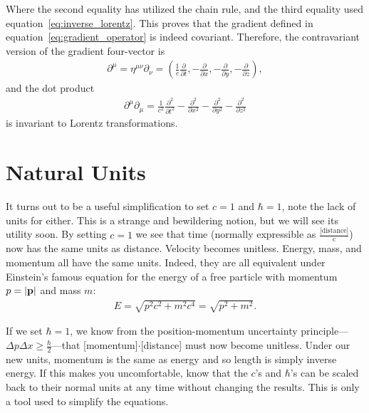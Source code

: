 \documentclass[titlepage,letterpaper,onecolumn,11pt,final]{report}
\numberwithin{equation}{section}
\numberwithin{figure}{section}
\begin{document}
%
Where the second equality has utilized the chain rule, and the third equality used equation~\ref{eq:inverse_lorentz}. This proves that the gradient defined in equation~\ref{eq:gradient_operator} is indeed covariant. Therefore, the contravariant version of the gradient four-vector is
\begin{gather}
	\label{eq:contravariant_gradient}
	\partial^{\mu} =  \eta^{\mu \nu} \partial_{\nu} = \left( \frac{1}{c} \frac{\partial}{\partial t}, -\frac{\partial}{\partial x}, -\frac{\partial}{\partial y}, -\frac{\partial}{\partial z} \right),
\end{gather}
%
and the dot product
\begin{gather}
	\label{eq:covariant_gradient}
	\partial^{\mu} \partial_{\mu} =  \frac{1}{c^{2}} \frac{\partial^{2}}{\partial t^{2}} -\frac{\partial^{2}}{\partial x^{2}} -\frac{\partial^{2}}{\partial y^{2}} -\frac{\partial^{2}}{\partial z^{2}}
\end{gather}
%
is invariant to Lorentz transformations.

\section{Natural Units}

It turns out to be a useful simplification to set $c = 1$ and $\hbar = 1$, note the lack of units for either. This is a strange and bewildering notion, but we will see its utility soon. By setting $c = 1$ we see that time (normally expressible as $\frac{\text{[distance]}}{\text{c}}$) now has the same units as distance. Velocity becomes unitless. Energy, mass, and momentum all have the same units. Indeed, they are all equivalent under Einstein's famous equation for the energy of a free particle with momentum $p = \left| \bf{p} \right|$ and mass $m$:
\begin{gather}
	\label{eq:Energy_mass_equivalence}
	E = \sqrt{p^{2} c^{2} + m^{2} c^{4}} = \sqrt{p^{2} + m^{2}} .
\end{gather}

If we set $\hbar = 1$, we know from the position-momentum uncertainty principle---$\Delta p \Delta x \geq \frac{\hbar}{2}$---that [momentum]$\cdot$[distance] must now become unitless. Under our new units, momentum is the same as energy and so length is simply inverse energy. If this makes you uncomfortable, know that the $c$'s and $\hbar$'s can be scaled back to their normal units at any time without changing the results. This is only a tool used to simplify the equations.
\end{document}
